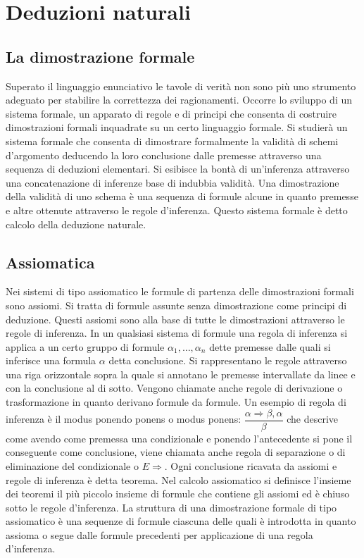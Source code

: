 \chapter{Deduzioni naturali}
\section{La dimostrazione formale}
Superato il linguaggio enunciativo le tavole di verit\`a non sono pi\`u uno strumento adeguato per stabilire la correttezza dei ragionamenti. Occorre lo sviluppo di un sistema formale, un apparato di regole e di 
principi che consenta di costruire dimostrazioni formali inquadrate su un certo linguaggio formale. Si studier\`a un sistema formale che consenta di dimostrare formalmente la validit\`a di schemi d'argomento 
deducendo la loro conclusione dalle premesse attraverso una sequenza di deduzioni elementari. Si esibisce la bont\`a di un'inferenza attraverso una concatenazione di inferenze base di indubbia validit\`a. Una 
dimostrazione della validit\`a di uno schema \`e una sequenza di formule alcune in quanto premesse e altre ottenute attraverso le regole d'inferenza. Questo sistema formale \`e detto calcolo della deduzione 
naturale.
\section{Assiomatica}
Nei sistemi di tipo assiomatico le formule di partenza delle dimostrazioni formali sono assiomi. Si tratta di formule assunte senza dimostrazione come principi di deduzione. Questi assiomi sono alla base di tutte 
le dimostrazioni attraverso le regole di inferenza. In un qualsiasi sistema di formule una regola di inferenza si applica a un certo gruppo di formule $\alpha_1,\dots, \alpha_n$ dette premesse dalle quali si 
inferisce una formula $\alpha$ detta conclusione. Si rappresentano le regole attraverso una riga orizzontale sopra la quale si annotano le premesse intervallate da linee e con la conclusione al di sotto. Vengono 
chiamate anche regole di derivazione o trasformazione in quanto derivano formule da formule. Un esempio di regola di inferenza \`e il modus ponendo ponens o modus ponens: $\dfrac{\alpha\Rightarrow\beta, 
\alpha}{\beta}$ che descrive come avendo come premessa una condizionale e ponendo l'antecedente si pone il conseguente come conclusione, viene chiamata anche regola di separazione o di eliminazione del 
condizionale o $E\Rightarrow$. Ogni conclusione ricavata da assiomi e regole di inferenza \`e detta teorema. Nel calcolo assiomatico si definisce l'insieme dei teoremi il pi\`u piccolo insieme di formule che 
contiene gli assiomi ed \`e chiuso sotto le regole d'inferenza. La struttura di una dimostrazione formale di tipo assiomatico \`e una sequenze di formule ciascuna delle quali \`e introdotta in quanto assioma o 
segue dalle formule precedenti per applicazione di una regola d'inferenza.  
